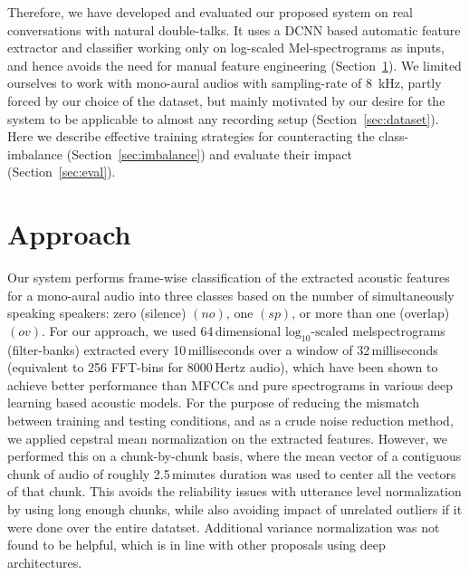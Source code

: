 \documentclass[a4paper]{article}
\begin{document}
Therefore, we have developed and evaluated our proposed system on real conversations with natural double-talks.
It uses a DCNN based automatic feature extractor and classifier working only on
log-scaled Mel-spectrograms as inputs,
and hence avoids the need for manual feature engineering
(Section~\ref{sec:approach}).
We limited ourselves to work with mono-aural audios with sampling-rate of 8~kHz,
partly forced by our choice of the dataset,
but mainly motivated by our desire for the system to be applicable to almost any recording setup
(Section~\ref{sec:dataset}).
Here we describe effective training strategies for counteracting the class-imbalance
(Section~\ref{sec:imbalance}) and evaluate their impact (Section~\ref{sec:eval}).

\section{Approach} \label{sec:approach}
Our system performs frame-wise classification of the extracted acoustic features for a mono-aural audio into three classes based on the number of simultaneously speaking speakers:
zero (silence) $(no)$, one $(sp)$, or more than one (overlap) $(ov)$.
For our approach, we used 64\,dimensional $\text{log}_{10} \text{-scaled}$ melspectrograms (filter-banks)
extracted every 10\,milliseconds over a window of 32\,milliseconds (equivalent to 256 FFT-bins for 8000\,Hertz audio),
which have been shown to achieve better performance than MFCCs and pure spectrograms in various deep learning based acoustic models.  %
For the purpose of reducing the mismatch between training and testing conditions, and as a crude noise reduction method,
we applied cepstral mean normalization on the extracted features.
However, we performed this on a chunk-by-chunk basis,
where the mean vector of a contiguous chunk of audio of roughly 2.5\,minutes duration was used to center all the vectors of that chunk.
This avoids the reliability issues with utterance level normalization by using long enough chunks,
while also avoiding impact of unrelated outliers if it were done over the entire datatset.
Additional variance normalization was not found to be helpful,
which is in line with other proposals using deep architectures.  %
\end{document}
